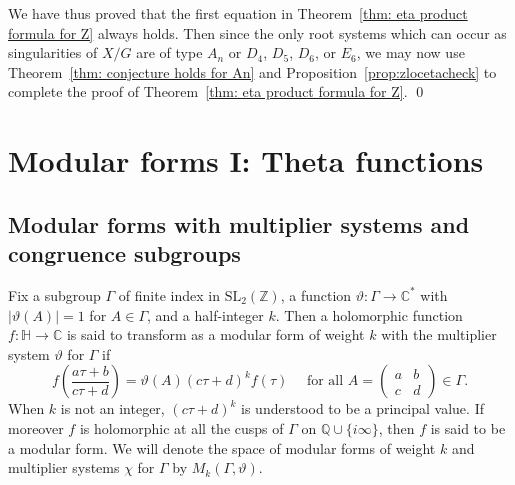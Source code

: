 \documentclass{article}
\theoremstyle{definition}
\newcommand{\CC} {{\mathbb C}}          %
\newcommand{\ZZ} {{\mathbb Z}}		%
\newcommand{\QQ} {{\mathbb Q}}		%
\begin{document}
We have thus proved that the first equation in Theorem~\ref{thm: eta
product formula for Z} always holds. Then since the only root systems
which can occur as singularities of $X/G$ are of type $A_{n}$ or
$D_{4}$, $D_{5}$, $D_{6}$, or $E_{6}$, we may now use
Theorem~\ref{thm: conjecture holds for An} and Proposition~\ref{prop:zlocetacheck} to
complete the proof of Theorem~\ref{thm: eta product formula for
Z}. \qed

\section{Modular forms I: Theta functions}\label{sec: modular forms}

\subsection{Modular forms with multiplier systems and congruence subgroups}

Fix a
subgroup $\Gamma$ of finite index in $\mathrm{SL_2}( \ZZ)$, a function $\vartheta \colon
\Gamma \to  \CC^{\ast}$ with $|\vartheta(A)|=1$ for $A \in \Gamma$, and a half-integer $k$.
Then a holomorphic function $f \colon \mathbb{H} \to  \CC$ is said to transform as a modular
form of weight $k$ with the multiplier system $\vartheta$ for $\Gamma$ if
\[ f\left( \frac{a\tau+b}{c\tau+d}\right)=\vartheta(A)(c\tau+d)^k f(\tau) \quad 
\textrm{ for all } A=\begin{pmatrix}
a & b \\ c & d
\end{pmatrix} \in \Gamma. \]
When $k$ is not an integer, $(c\tau+d)^k$ is understood to be a principal value. If moreover
$f$ is holomorphic at all the cusps of $\Gamma$ on $ \QQ \cup \{i \infty\}$, then $f$ is said
to be a modular form. We will denote the space of modular forms of weight $k$ and multiplier
systems $\chi$ for $\Gamma$ by $M_k(\Gamma, \vartheta)$.
\end{document}
